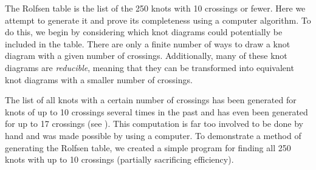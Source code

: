 \begin{paper}

The Rolfsen table is the list of the 250 knots with 10 crossings or fewer.
Here we attempt to generate it and prove its completeness using a computer
algorithm.
To do this, we begin by considering which knot diagrams could potentially be
included in the table.
There are only a finite number of ways to draw a knot diagram with a given
number of crossings.
Additionally, many of these knot diagrams are \textit{reducible}, meaning that
they can be transformed into equivalent knot diagrams with a smaller number of
crossings.

The list of all knots with a certain number of crossings has been generated for
knots of up to 10 crossings several times in the past and has even been
generated for up to 17 crossings (see \cite{htw}).
This computation is far too involved to be done by hand and was made possible by
using a computer.
To demonstrate a method of generating the Rolfsen table, we created a simple
program for finding all 250 knots with up to 10 crossings (partially sacrificing
efficiency).


\end{paper}

